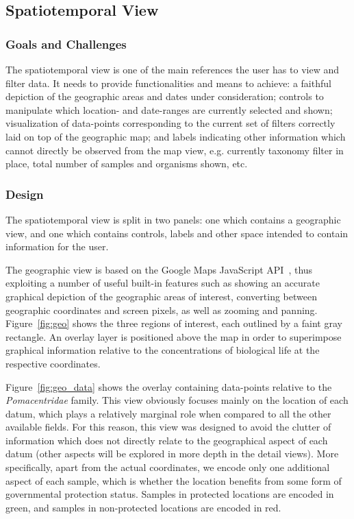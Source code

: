 \documentclass[letterpaper]{article} %
\begin{document}
\subsection{Spatiotemporal View}

\subsubsection{Goals and Challenges}

The spatiotemporal view is one of the main references the user has to view and
filter data.  It needs to provide functionalities and means to achieve:
a faithful depiction of the geographic areas and dates under consideration;
controls to manipulate which location- and date-ranges are currently selected
and shown;  visualization of data-points corresponding to the current set of
filters correctly laid on top of the geographic map; and labels indicating
other information which cannot directly be observed from the map view, e.g.
currently taxonomy filter in place, total number of samples and organisms
shown, etc.

\subsubsection{Design}

The spatiotemporal view is split in two panels:  one which contains
a geographic view, and one which contains controls, labels and other space
intended to contain information for the user. 

The geographic view is based on the Google Maps JavaScript API~\cite{gmapsapi},
thus exploiting a number of useful built-in features such as showing an
accurate graphical depiction of the geographic areas of interest, converting
between geographic coordinates and screen pixels, as well as zooming and
panning.  Figure~\ref{fig:geo} shows the three regions of interest, each
outlined by a faint gray rectangle.  An overlay layer is positioned above the
map in order to superimpose graphical information relative to the
concentrations of biological life at the respective coordinates.

Figure~\ref{fig:geo_data} shows the overlay containing data-points relative to
the \emph{Pomacentridae} family.  This view obviously focuses mainly on the
location of each datum, which plays a relatively marginal role when compared to
all the other available fields.  For this reason, this view was designed to
avoid the clutter of information which does not directly relate to the
geographical aspect of each datum (other aspects will be explored in more depth
in the detail views).  More specifically, apart from the actual coordinates, we
encode only one additional aspect of each sample, which is whether the location
benefits from some form of governmental protection status.  Samples in
protected locations are encoded in green, and samples in non-protected
locations are encoded in red.
\end{document}
